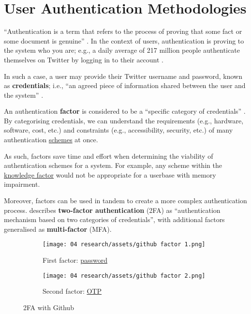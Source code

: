 \section{User Authentication Methodologies}

\enquote{Authentication is a term that refers to the
  process of proving that some fact or some document is
  genuine} \parencite{whatIsAuthentiction}.
In the context of users, authentication is proving to the
system who you are; e.g., a daily average of 217 million
people authenticate themselves on Twitter by logging in to
their account \parencite[][Q4]{twitterUsage}.

In such a case, a user may provide their Twitter username
and password, known as \textbf{credentials}; i.e.,
\enquote{an agreed piece of information shared between the
  user and the system} \parencite{whatIsAuthentiction}.

An authentication \textbf{factor} is considered to be a
\enquote{specific category of credentials}
\parencite{whatIsAuthentiction}.
By categorising credentials, we can understand the
requirements (e.g., hardware, software, cost, etc.) and
constraints (e.g., accessibility, security, etc.) of many
authentication \hyperref[ss:schemes]{schemes} at once.

As such, factors save time and effort when determining the
viability of authentication schemes for a system.
For example, any scheme within the
\hyperref[p:knowledge]{knowledge factor} would not be
appropriate for a userbase with memory impairment.

Moreover, factors can be used in tandem to create a more
complex authentication process.
\cite{whatIsAuthentiction}
describes \textbf{two-factor authentication} (2FA) as
\enquote{authentication mechanism based on two categories
  of credentials}, with additional factors generalised as
\textbf{multi-factor} (MFA).

\begin{figure}[H]
  \centering
  \begin{subfigure}{0.49\textwidth}
    \centering
    \texttt{[image: 04
      research/assets/github factor 1.png]}
    \caption{First factor:
      \hyperref[p:passwords]{password}}
  \end{subfigure}
  \begin{subfigure}{0.49\textwidth}
    \centering
    \texttt{[image: 04
      research/assets/github factor 2.png]}
    \caption{Second factor:
      \hyperref[ss:opt]{OTP}}

  \end{subfigure}

  \caption{2FA with Github}
\end{figure}

